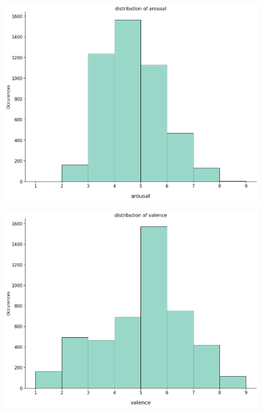 \documentclass[a4paper,11pt,dvipsnames]{article}
\begin{document}
\begin{figure}[ht]
\centering
\begin{minipage}[b]{.3\linewidth}
\centering\large \includegraphics[width=0.9\linewidth]{Graphs/arousal_distributiom.png}
\label{fig:ardis}
\end{minipage}%
\begin{minipage}[b]{.3\linewidth}
\centering\includegraphics[width=0.9\linewidth]{Graphs/valence_distribution.png}\label{fig:valdis}
\end{minipage}
\begin{minipage}[b]{.3\linewidth}

\end{minipage}
\end{figure}
\end{document}
